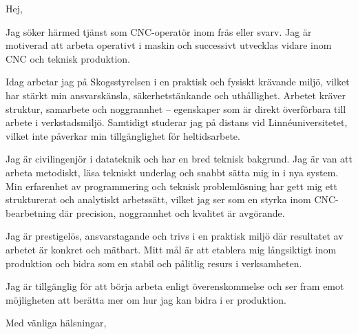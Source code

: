 \documentclass[a4paper,11pt]{letter}
\date{\today}
\begin{document}
\begin{letter}{}

\opening{Hej,}

Jag söker härmed tjänst som CNC-operatör inom fräs eller svarv. Jag är motiverad att arbeta operativt i maskin och successivt utvecklas vidare inom CNC och teknisk produktion.

Idag arbetar jag på Skogsstyrelsen i en praktisk och fysiskt krävande miljö, vilket har stärkt min ansvarskänsla, säkerhetstänkande och uthållighet. Arbetet kräver struktur, samarbete och noggrannhet – egenskaper som är direkt överförbara till arbete i verkstadsmiljö. Samtidigt studerar jag på distans vid Linnéuniversitetet, vilket inte påverkar min tillgänglighet för heltidsarbete.

Jag är civilingenjör i datateknik och har en bred teknisk bakgrund. Jag är van att arbeta metodiskt, läsa tekniskt underlag och snabbt sätta mig in i nya system. Min erfarenhet av programmering och teknisk problemlösning har gett mig ett strukturerat och analytiskt arbetssätt, vilket jag ser som en styrka inom CNC-bearbetning där precision, noggrannhet och kvalitet är avgörande.

Jag är prestigelös, ansvarstagande och trivs i en praktisk miljö där resultatet av arbetet är konkret och mätbart. Mitt mål är att etablera mig långsiktigt inom produktion och bidra som en stabil och pålitlig resurs i verksamheten.

Jag är tillgänglig för att börja arbeta enligt överenskommelse och ser fram emot möjligheten att berätta mer om hur jag kan bidra i er produktion.

\closing{Med vänliga hälsningar,}   

\end{letter}
\end{document}
